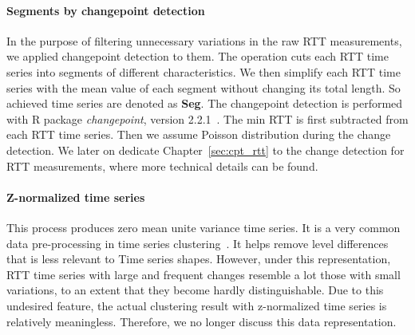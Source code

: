 \paragraph*{Segments by changepoint detection} In the purpose of filtering unnecessary variations in the raw RTT measurements, we applied changepoint detection to them. 
The operation cuts each RTT time series into segments of different characteristics. 
We then simplify each RTT time series with the mean value of each segment without changing its total length. 
So achieved time series are denoted as \textbf{Seg}. 
The changepoint detection is performed with R package \textit{changepoint}, version 2.2.1~\cite{Killick2013a}. 
The min RTT is first subtracted from each RTT time series. 
Then we assume Poisson distribution during the change detection. 
We later on dedicate Chapter~\ref{sec:cpt_rtt} to the change detection for RTT measurements, where more technical details can be found.

\paragraph*{Z-normalized time series} This process produces zero mean unite variance time series. It is a very common data pre-processing in time series clustering~\cite{Ulanova2015,Ratanamahatana2004}. It helps remove level differences that is less relevant to Time series shapes. However, under this representation, RTT time series with large and frequent changes resemble a lot those with small variations, to an extent that they become hardly distinguishable. Due to this undesired feature, the actual clustering result with z-normalized time series is relatively meaningless. Therefore, we no longer discuss this data representation.

